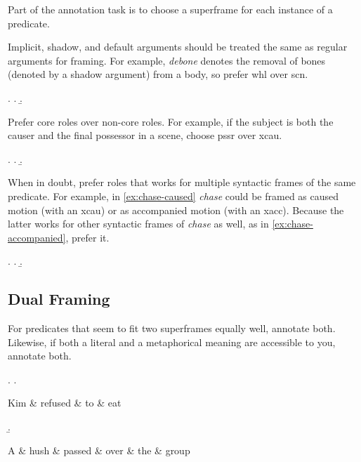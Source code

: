 \documentclass[a4paper]{article}
\begin{document}
Part of the annotation task is to choose a superframe for each instance of a predicate.

Implicit, shadow, and default arguments \citep{di-fabio-etal-2019-verbatlas} should
be treated the same as regular arguments for framing. For example,
\emph{debone} denotes the removal of bones (denoted by a shadow argument) from
a body, so prefer \textsf{whl} over \textsf{scn}.

\ex. \a. 
     \b. 


Prefer core roles over non-core roles. For example, if the subject is both the causer and the final possessor in a scene, choose \textsf{pssr} over \textsf{xcau}.

\ex. \a. 
     \b. 

When in doubt, prefer roles that works for multiple syntactic frames of the
same predicate. For example, in \ref{ex:chase-caused} \emph{chase} could be
framed as caused motion (with an \textsf{xcau}) or as accompanied motion (with
an \textsf{xacc}). Because the latter works for other syntactic frames of
\emph{chase} as well, as in \ref{ex:chase-accompanied}, prefer it.

\ex. \a. \label{ex:chase-caused} 
     \b. \label{ex:chase-accompanied} 

\subsection{Dual Framing}

For predicates that seem to fit two superframes equally well, annotate both. Likewise, if both a literal and a metaphorical meaning are accessible to you, annotate both.

\ex.
\a. \begin{dependency}
    \begin{deptext}
        Kim \& refused \& to \& eat \\
    \end{deptext}
\end{dependency}
\b. \begin{dependency}
    \begin{deptext}
        A \& hush \& passed \& over \& the \& group \\
    \end{deptext}
\end{dependency}
\end{document}
